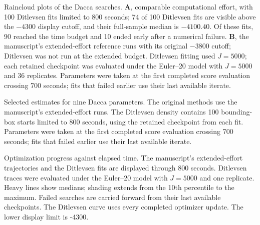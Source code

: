 
\caption{Raincloud plots of the Dacca searches. \textbf{A}, comparable
computational effort, with 100 Ditlevsen fits limited to 800 seconds;
74 of 100 Ditlevsen fits are visible above the
$-4300$ display cutoff, and their full-sample median is
$-4100.40$. Of these fits, 90 reached the time budget and
10 ended early after a numerical failure. \textbf{B}, the
manuscript's extended-effort reference runs with its original
$-3800$ cutoff; Ditlevsen was not run at the
extended budget. Ditlevsen fitting used $J=5000$; each retained
checkpoint was evaluated under the Euler--20 model with $J=5000$
and 36 replicates. Parameters were taken at the first completed score evaluation crossing 700 seconds; fits that failed earlier use their last available iterate.}

\caption{Selected estimates for nine Dacca parameters. The original methods
use the manuscript's extended-effort runs. The Ditlevsen density contains
100 bounding-box starts limited to 800 seconds, using the retained
checkpoint from each fit. Parameters were taken at the first completed score evaluation crossing 700 seconds; fits that failed earlier use their last available iterate.}

\caption{Optimization progress against elapsed time. The manuscript's
extended-effort trajectories and the Ditlevsen fits are displayed through
800 seconds. Ditlevsen traces were evaluated under the Euler--20 model
with $J=5000$ and one replicate. Heavy lines show medians;
shading extends from the 10th percentile to the maximum. Failed searches are
carried forward from their last available checkpoints. The Ditlevsen curve uses every completed optimizer update. The lower display limit
is -4300.}

